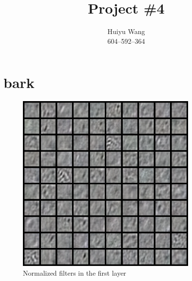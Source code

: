 \documentclass[11pt, oneside]{article}   	%
\title{Project \#4}
\author{Huiyu Wang\\604--592--364}
\date{}							%
\begin{document}
\maketitle

\section{bark}
\begin{figure}[H]
	\centering
	\includegraphics[width=0.8\textwidth]{bark}
	\caption{Normalized filters in the first layer}
	\label {fig:barkf}
\end{figure}
\end{document}
